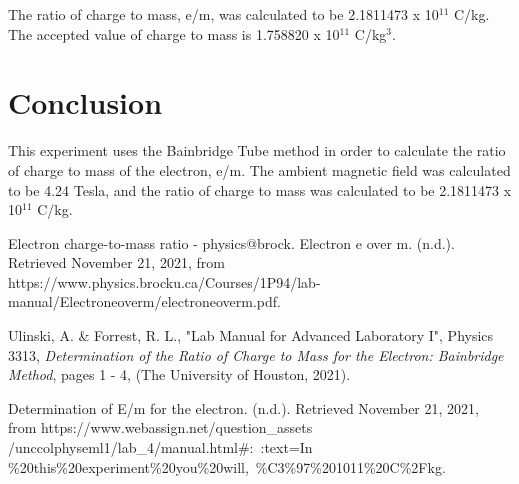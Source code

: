 \documentclass[twoside,10pt]{article}
\begin{document}
\begin{multicols}{2}
		The ratio of charge to mass, e/m, was calculated to be 2.1811473 x 10$^{11}$ C/kg. The accepted value of charge to mass is 1.758820 x 10$^{11}$ C/kg$^3$.
		
		\section{Conclusion}
		This experiment uses the Bainbridge Tube method in order to calculate the ratio of charge to mass of the electron, e/m. The ambient magnetic field was calculated to be 4.24 Tesla, and the ratio of charge to mass was calculated to be 2.1811473 x 10$^{11}$ C/kg. 
		
		
		
		\begin{thebibliography}{99} %
			\raggedright
			
			\begin{small}
				Electron charge-to-mass ratio - physics@brock. Electron e over m. (n.d.). Retrieved November 21, 2021, from https://www.physics.brocku.ca/Courses/1P94/lab-manual/Electroneoverm/electroneoverm.pdf. 
				

				
				Ulinski, A. \& Forrest, R. L., "Lab Manual for Advanced Laboratory I", Physics 3313, \textit{Determination of the Ratio of Charge to Mass for the Electron: Bainbridge Method}, pages 1 - 4, (The University of Houston, 2021).

				Determination of E/m for the electron. (n.d.). Retrieved November 21, 2021, from https://www.webassign.net/question\_assets
				/unccolphyseml1/lab\_4/manual.html#:~:text=In
				\%20this\%20experiment\%20you\%20will,\
				\%C3\%97\%201011\%20C\%2Fkg. 
				
			\end{small}
			
			
		\end{thebibliography}
		
		
	\end{multicols}
	
\end{document}
